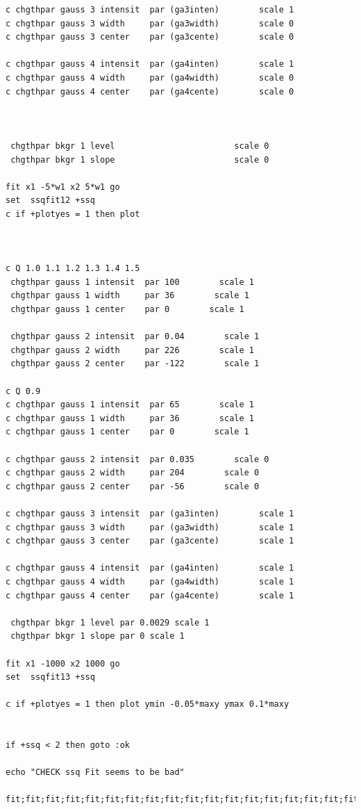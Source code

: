 \documentclass[11pt,fleqn]{book} %
\begin{document}
\begin{verbatim}
c chgthpar gauss 3 intensit  par (ga3inten)        scale 1
c chgthpar gauss 3 width     par (ga3width)        scale 0
c chgthpar gauss 3 center    par (ga3cente)        scale 0

c chgthpar gauss 4 intensit  par (ga4inten)        scale 1
c chgthpar gauss 4 width     par (ga4width)        scale 0
c chgthpar gauss 4 center    par (ga4cente)        scale 0
 


 chgthpar bkgr 1 level                        scale 0
 chgthpar bkgr 1 slope                        scale 0

fit x1 -5*w1 x2 5*w1 go
set  ssqfit12 +ssq
c if +plotyes = 1 then plot



c Q 1.0 1.1 1.2 1.3 1.4 1.5
 chgthpar gauss 1 intensit  par 100        scale 1
 chgthpar gauss 1 width     par 36        scale 1
 chgthpar gauss 1 center    par 0        scale 1

 chgthpar gauss 2 intensit  par 0.04        scale 1
 chgthpar gauss 2 width     par 226        scale 1
 chgthpar gauss 2 center    par -122        scale 1

c Q 0.9
c chgthpar gauss 1 intensit  par 65        scale 1
c chgthpar gauss 1 width     par 36        scale 1
c chgthpar gauss 1 center    par 0        scale 1

c chgthpar gauss 2 intensit  par 0.035        scale 0
c chgthpar gauss 2 width     par 204        scale 0
c chgthpar gauss 2 center    par -56        scale 0

c chgthpar gauss 3 intensit  par (ga3inten)        scale 1
c chgthpar gauss 3 width     par (ga3width)        scale 1
c chgthpar gauss 3 center    par (ga3cente)        scale 1

c chgthpar gauss 4 intensit  par (ga4inten)        scale 1
c chgthpar gauss 4 width     par (ga4width)        scale 1
c chgthpar gauss 4 center    par (ga4cente)        scale 1

 chgthpar bkgr 1 level par 0.0029 scale 1
 chgthpar bkgr 1 slope par 0 scale 1

fit x1 -1000 x2 1000 go
set  ssqfit13 +ssq

c if +plotyes = 1 then plot ymin -0.05*maxy ymax 0.1*maxy


if +ssq < 2 then goto :ok

echo "CHECK ssq Fit seems to be bad"

fit;fit;fit;fit;fit;fit;fit;fit;fit;fit;fit;fit;fit;fit;fit;fit;fit;fit;fit;fit;fit;fit;fit;fit;fit;fit;fit;fit;fit;fit;fit;fit;fit;fit;fit;


\end{verbatim}
\end{document}
